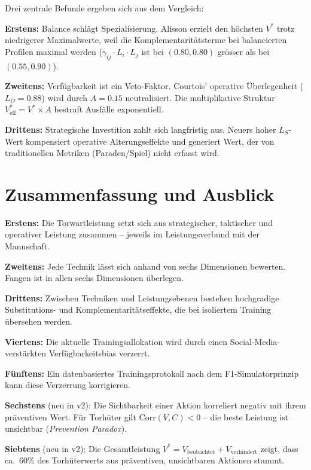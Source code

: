\documentclass[12pt,a4paper]{article}
\begin{document}
Drei zentrale Befunde ergeben sich aus dem Vergleich:

\textbf{Erstens:} Balance schl\"agt Spezialisierung. Alisson erzielt den h\"ochsten $V^{*}$ trotz niedrigerer Maximalwerte, weil die Komplementarit\"atsterme bei balancierten Profilen maximal werden ($\gamma_{ij} \cdot L_i \cdot L_j$ ist bei $(0.80, 0.80)$ gr\"osser als bei $(0.55, 0.90)$).

\textbf{Zweitens:} Verf\"ugbarkeit ist ein Veto-Faktor. Courtois' operative \"Uberlegenheit ($L_O = 0.88$) wird durch $A = 0.15$ neutralisiert. Die multiplikative Struktur $V^{*}_{\text{eff}} = V^{*} \times A$ bestraft Ausf\"alle exponentiell.

\textbf{Drittens:} Strategische Investition zahlt sich langfristig aus. Neuers hoher $L_S$-Wert kompensiert operative Alterungseffekte und generiert Wert, der von traditionellen Metriken (Paraden/Spiel) nicht erfasst wird.


\section{Zusammenfassung und Ausblick}
\label{sec:zusammenfassung}

\textbf{Erstens:} Die Torwartleistung setzt sich aus strategischer, taktischer und operativer Leistung zusammen -- jeweils im Leistungsverbund mit der Mannschaft.

\textbf{Zweitens:} Jede Technik l\"asst sich anhand von sechs Dimensionen bewerten. Fangen ist in allen sechs Dimensionen \"uberlegen.

\textbf{Drittens:} Zwischen Techniken und Leistungsebenen bestehen hochgradige Substitutions- und Komplementarit\"atseffekte, die bei isoliertem Training \"ubersehen werden.

\textbf{Viertens:} Die aktuelle Trainingsallokation wird durch einen Social-Media-verst\"arkten Verf\"ugbarkeitsbias verzerrt.

\textbf{F\"unftens:} Ein datenbasiertes Trainingsprotokoll nach dem F1-Simulatorprinzip kann diese Verzerrung korrigieren.

\textbf{Sechstens} (neu in v2): Die Sichtbarkeit einer Aktion korreliert negativ mit ihrem pr\"aventiven Wert. F\"ur Torh\"uter gilt $\text{Corr}(V,C) < 0$ -- die beste Leistung ist unsichtbar (\emph{Prevention Paradox}).

\textbf{Siebtens} (neu in v2): Die Gesamtleistung $V^{*} = V_{\text{beobachtet}} + V_{\text{verhindert}}$ zeigt, dass ca.\ 60\% des Torh\"uterwerts aus pr\"aventiven, unsichtbaren Aktionen stammt.
\end{document}
